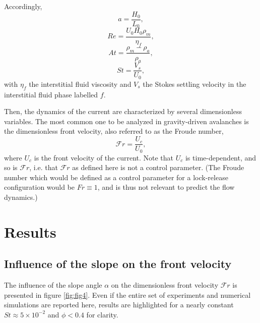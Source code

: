 \documentclass[twocolumn]{article}
\begin{document}
Accordingly,
\begin{equation}
	\displaystyle a =\frac{H_0}{L_0},
\end{equation}
\begin{equation}
	\displaystyle Re = \frac{U_0 H_0\rho_m}{\eta_f},
\end{equation}
\begin{equation}
	\displaystyle At = \frac{\rho_m-\rho_a}{\rho_a},
\end{equation}
\begin{equation}
	\displaystyle St = \frac{V_s}{U_0},
\end{equation}
with $\eta_f$ the interstitial fluid viscosity and $V_s$ the Stokes settling velocity in the interstitial fluid phase labelled $f$.


Then, the dynamics of the current are characterized by several dimensionless variables. The most common one to be analyzed in gravity-driven avalanches is the dimensionless front velocity, also referred to as the Froude number,
\begin{equation}
	\displaystyle \mathcal{F}r =\frac{U_c}{U_0},
\end{equation}
where $U_c$ is the front velocity of the current. Note that $U_c$ is time-dependent, and so is $\mathcal{F}r$, i.e. that $\mathcal{F}r$ as defined here is not a control parameter. (The Froude number which would be defined as a control parameter for a lock-release configuration would be $Fr\equiv 1$, and is thus not relevant to predict the flow dynamics.)

\section{Results}

\subsection{Influence of the slope on the front velocity}

The influence of the slope angle $\alpha$ on the dimensionless front velocity $\mathcal{F}r$ is presented in figure \ref{fig:fig4}. Even if the entire set of experiments and numerical simulations are reported here, results are highlighted for a nearly constant $St\approx 5\times 10^{-2}$ and $\phi < 0.4$ for clarity.
\end{document}
